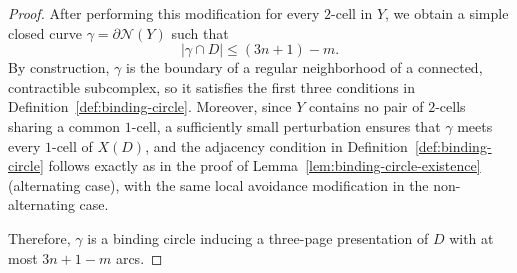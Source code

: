 \documentclass[10pt,a4paper]{amsart}
\begin{document}
\begin{proof}
After performing this modification for every $2$-cell in $Y$, we obtain a simple closed curve $\gamma=\partial \mathcal{N}(Y)$ such that
$$
|\gamma \cap D| \le (3n+1) - m.
$$
By construction, $\gamma$ is the boundary of a regular neighborhood of a connected, contractible subcomplex, so it satisfies the first three conditions in Definition~\ref{def:binding-circle}.
Moreover, since $Y$ contains no pair of $2$-cells sharing a common $1$-cell, a sufficiently small perturbation ensures that $\gamma$ meets every $1$-cell of $X(D)$, and the adjacency condition in Definition~\ref{def:binding-circle} follows exactly as in the proof of Lemma~\ref{lem:binding-circle-existence} (alternating case), with the same local avoidance modification in the non-alternating case.

Therefore, $\gamma$ is a binding circle inducing a three-page presentation of $D$ with at most $3n+1-m$ arcs.
\end{proof}
\end{document}
